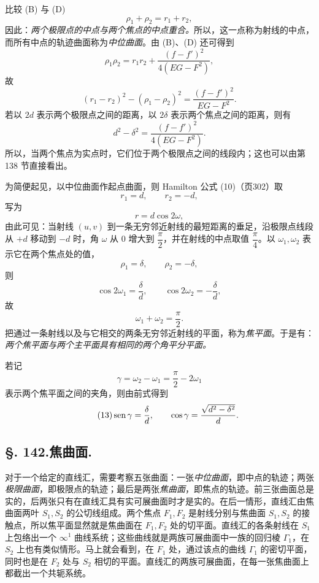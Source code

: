比较 (B) 与 (D)
\[
 \rho_1+\rho_2=r_1+r_2,
\]
因此：\emph{两个极限点的中点与两个焦点的中点重合。}所以，这一点称为射线的中点，而所有中点的轨迹曲面称为\emph{中位曲面}。由 (B)、(D) 还可得到
\[
 \rho_1\rho_2=r_1r_2+\frac{(f-f')^2}{4(EG-F^2)},
\]
故
\[
 (r_1-r_2)^2-(\rho_1-\rho_2)^2=\frac{(f-f')^2}{EG-F^2}.
\]
若以 \(2d\) 表示两个极限点之间的距离，以 \(2\delta\) 表示两个焦点之间的距离，则有
\begin{equation}\tag{12}
 d^2-\delta^2=\frac{(f-f')^2}{4(EG-F^2)}.
\end{equation}
所以，当两个焦点为实点时，它们位于两个极限点之间的线段内；这也可以由第 138 节直接看出。

为简便起见，以中位曲面作起点曲面，则 Hamilton 公式 (10)（页302）取
\[
 r_1=d,
 \qquad r_2=-d,
\]
写为
\[
 r=d\cos2\omega,
\]
由此可见：当射线 \((u,v)\) 到一条无穷邻近射线的最短距离的垂足，沿极限点线段从 \(+d\) 移动到 \(-d\) 时，角 \(\omega\) 从 \(0\) 增大到 \(\dfrac\pi2\)，并在射线的中点取值 \(\dfrac\pi4\)。以 \(\omega_1,\omega_2\) 表示它在两个焦点处的值，
\[
 \rho_1=\delta,
 \qquad \rho_2=-\delta,
\]
则
\[
 \cos2\omega_1=\frac\delta d,
 \qquad \cos2\omega_2=-\frac\delta d,
\]
故
\[
 \omega_1+\omega_2=\frac\pi2.
\]
把通过一条射线以及与它相交的两条无穷邻近射线的平面，称为\emph{焦平面}。于是有：\emph{两个焦平面与两个主平面具有相同的两个角平分平面。}

若记
\[
 \gamma=\omega_2-\omega_1=\frac\pi2-2\omega_1
\]
表示两个焦平面之间的夹角，则由前式得到
\begin{equation}\tag{13}
 \operatorname{sen}\gamma=\frac\delta d,
 \qquad
 \cos\gamma=\frac{\sqrt{d^2-\delta^2}}{d}.
\end{equation}

\subsection*{\S. 142.\quad 焦曲面.}

对于一个给定的直线汇，需要考察五张曲面：一张\emph{中位曲面}，即中点的轨迹；两张\emph{极限曲面}，即极限点的轨迹；最后是两张\emph{焦曲面}，即焦点的轨迹。前三张曲面总是实的，后两张只有在直线汇具有实可展曲面时才是实的。在后一情形，直线汇由焦曲面两叶 \(S_1,S_2\) 的公切线组成。两个焦点 \(F_1,F_2\) 是射线分别与焦曲面 \(S_1,S_2\) 的接触点，所以焦平面显然就是焦曲面在 \(F_1,F_2\) 处的切平面。直线汇的各条射线在 \(S_1\) 上包络出一个 \(\infty^1\) 曲线系统；这些曲线就是两族可展曲面中一族的回归棱 \(\Gamma_1\)，在 \(S_2\) 上也有类似情形。马上就会看到，在 \(F_1\) 处，通过该点的曲线 \(\Gamma_1\) 的密切平面，同时也是在 \(F_2\) 处与 \(S_2\) 相切的平面。直线汇的两族可展曲面，在每一张焦曲面上都截出一个共轭系统。


